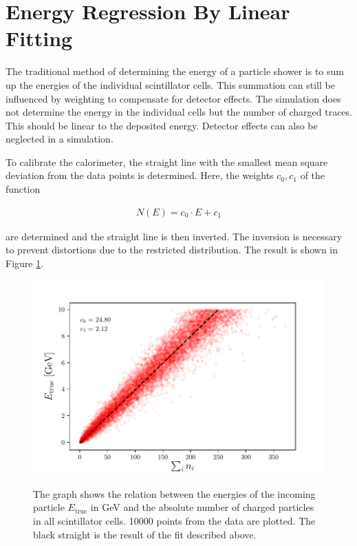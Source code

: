 \documentclass[12pt, a4paper]{thesis}
\begin{document}
\section{Energy Regression By Linear Fitting}
\label{sec:orgd10286d}

The traditional method of determining the energy of a particle shower
is to sum up the energies of the individual scintillator cells. This
summation can still be influenced by weighting to compensate for
detector effects. The simulation does not determine the energy in the
individual cells but the number of charged traces. This should be
linear to the deposited energy. Detector effects can also be neglected
in a simulation.

To calibrate the calorimeter, the straight line with the smallest mean
square deviation from the data points is determined. Here, the weights
\(c_0, c_1\) of the function

\begin{align}
N(E) = c_0 \cdot E + c_1
\end{align}

are determined and the straight line is then inverted. The inversion
is necessary to prevent distortions due to the restricted
distribution. The result is shown in Figure \ref{e-vs-sum_n_fit}.

\label{e-vs-sum_n_fit}
\begin{figure}[htbp]
\centering
\includegraphics[width=.9\linewidth]{../images/e-vs-sum_n_fit.pdf}
\label{e-vs-sum_n_fit}
\caption{ The graph shows the relation between the energies of the
  incoming particle \(E_{\text{true}}\) in GeV and the absolute number
  of charged particles in all scintillator cells.  10000 points from
  the data are plotted. The black straight is the result of the fit
  described above.}
\end{figure}
\end{document}
